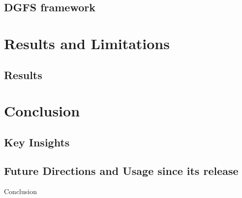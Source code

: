 \documentclass[aspectratio=169,xcolor=dvipsnames]{beamer}
\begin{document}
\subsection{DGFS framework}


\section{Results and Limitations}

\subsection{Results}


\section{Conclusion}

\subsection{Key Insights}

\subsection{Future Directions and Usage since its release}

\begin{frame}{Conclusion}

\end{frame}
\end{document}
